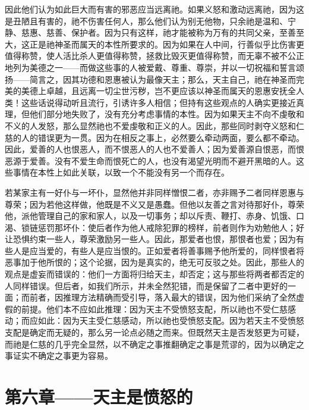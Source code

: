 因此他们认为如此巨大而有害的邪恶应当远离祂。如果义怒和激动远离祂，因为这是丑陋且有害的，祂不伤害任何人，那么他们认为别无他物，只余祂是温和、宁静、慈惠、慈善、保护者。因为只有这样，祂才能被称为万有的共同父亲，至善至大，这正是祂神圣而属天的本性所要求的。因为如果在人中间，行善似乎比伤害更值得称赞，使人活比杀人更值得称赞，拯救比毁灭更值得称赞，而无辜不被不公正地列为美德之一——而做这些事的人被爱戴、尊重、尊崇，并以一切祝福和誓言颂扬——简言之，因其功德和恩惠被认为最像天主；那么，天主自己，祂在神圣而完美的美德上卓越，且远离一切尘世污秽，岂不更应该以神圣而属天的恩惠安抚全人类！这些话说得动听且流行，引诱许多人相信；但持有这些观点的人确实更接近真理，但他们部分地失败了，没有充分考虑事情的本性。因为如果天主不向不虔敬和不义的人发怒，那么显然祂也不爱虔敬和正义的人。因此，那些同时剥夺义怒和仁慈的人的错误更为一贯。因为在相反之事上，必然要么牵动两面，要么都不牵动。因此，爱善的人也恨恶人，而不恨恶人的人也不爱善人；因为爱善源自恨恶，而恨恶源于爱善。没有不爱生命而恨死亡的人，也没有渴望光明而不避开黑暗的人。这些事情在本性上如此关联，以致一个不能没有另一个而存在。\par

若某家主有一好仆与一坏仆，显然他并非同样憎恨二者，亦非赐予二者同样恩惠与尊荣；因为若他这样做，他既是不义又是愚蠢。但他以友善之言对待那好仆，尊荣他，派他管理自己的家和家人，以及一切事务；却以斥责、鞭打、赤身、饥饿、口渴、锁链惩罚那坏仆：使后者作为他人戒除犯罪的榜样，前者则作为劝勉他人；好让恐惧约束一些人，尊荣激励另一些人。因此，那爱者也恨，那恨者也爱；因为有些人是应当爱的，有些人是应当恨的。正如爱者将善事赐予他所爱的，同样恨者将恶事加于他所恨的；这个论据，因为是真实的，绝无可反驳之处。因此，那些人的观点是虚妄而错误的：他们一方面将归给天主，却否定；这与那些将两者都否定的人同样错误。但后者，如我们所示，并未全然犯错，而是保留了二者中更好的一面；而前者，因推理方法精确而受引导，落入最大的错误，因为他们采纳了全然虚假的前提。他们本不应如此推理：因为天主不受愤怒支配，所以祂也不受仁慈感动；而应如此：因为天主受仁慈感动，所以祂也受愤怒支配。因为若天主不受愤怒支配是确定而无疑的，那么另一论点必随之而来。但既然天主是否发怒更为可疑，而祂是仁慈的几乎完全显然，以不确定之事推翻确定之事是荒谬的，因为以确定之事证实不确定之事更为容易。\par


\section{第六章——天主是愤怒的}

